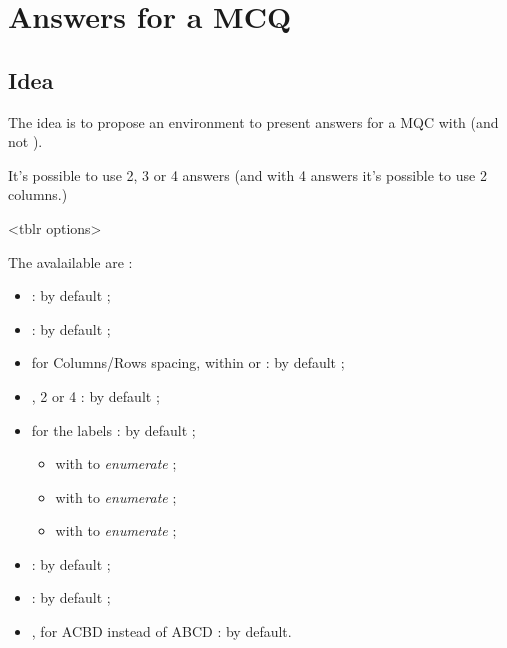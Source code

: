 \documentclass[english,11pt,a4paper]{article}
\begin{document}
\begin{codehigh}[language=latex/latex3,style/main=teal!25,style/code=teal!25]
\usepackage{customenvs}

\usepackage[option(s)]{customenvs}
\end{codehigh}

\newpage

\section{Answers for a MCQ}

\subsection{Idea}

The idea is to propose an environment to present answers for a MQC with  (and not ).

\smallskip

It's possible to use 2, 3 or 4 answers (and with 4 answers it's possible to use 2 columns.)

\begin{codehigh}[language=latex/latex3,style/main=teal!25,style/code=teal!25]
<tblr options>
\end{codehigh}

The avalailable  are :

\begin{itemize}
	\item {} :  by default ;
	\item {}  :  by default ;
	\item {} for Columns/Rows spacing, within  or  : \MontreCode{6pt/2pt} by default ;
	\item {}, 2 or 4 :  by default ;
	\item {} for the labels :  by default ;
	\begin{itemize}
		\item with  to \textit{enumerate}  ;
		\item with  to \textit{enumerate}  ;
		\item with  to \textit{enumerate}  ;
	\end{itemize}
	\item {} :  by default ;
	\item {} :  by default ;
	\item {}, for ACBD instead of ABCD :  by default.
\end{itemize}
\end{document}
